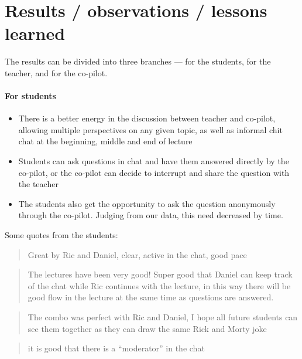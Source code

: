 \documentclass{article}
\begin{document}
\section*{Results / observations / lessons learned}

The results can be divided into three branches --- for the students, for the 
teacher, and for the co-pilot.

\paragraph{For students}

\begin{itemize}
  \item There is a better energy in the discussion between teacher and 
    co-pilot, allowing multiple perspectives on any given topic, as well as 
    informal chit chat at the beginning, middle and end of lecture

  \item Students can ask questions in chat and have them answered directly by 
    the co-pilot, or the co-pilot can decide to interrupt and share the 
    question with the teacher

  \item The students also get the opportunity to ask the question anonymously 
    through the co-pilot.
    Judging from our data, this need decreased by time.
\end{itemize}

Some quotes from the students:
\begin{quote}
Great by Ric and Daniel, clear, active in the chat, good pace
\end{quote}

\begin{quote}
The lectures have been very good! Super good that Daniel can keep track of
the chat while Ric continues with the lecture, in this way there will be
good flow in the lecture at the same time as questions are answered.
\end{quote}

\begin{quote}
The combo was perfect with Ric and Daniel, I hope all future students can
see them together as they can draw the same Rick and Morty joke
\end{quote}

\begin{quote}
  it is good that there is a \enquote{moderator} in the chat
\end{quote}
\end{document}
